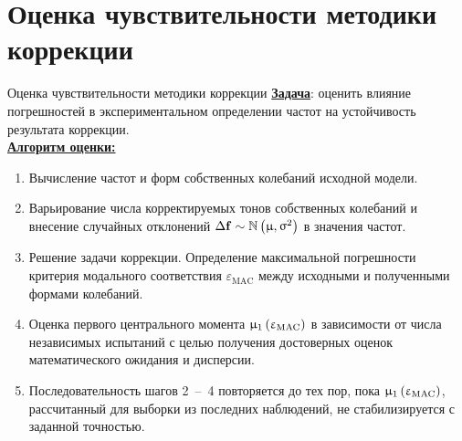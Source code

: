 \section{Оценка чувствительности методики коррекции}

\begin{frame}{Оценка чувствительности методики коррекции}
	\textbf{\underline{Задача}}: оценить влияние погрешностей в экспериментальном определении частот на устойчивость результата коррекции. \\ \vspace{0.5em}
	\textbf{\underline{Алгоритм оценки:}}
	\begin{enumerate}
		\item Вычисление частот и форм собственных колебаний исходной модели.
		\item Варьирование числа корректируемых тонов собственных колебаний и внесение случайных отклонений $ \Delta \mathbf{f} \sim \mathbb{N} \left( \upmu, \upsigma ^ 2 \right) $ в значения частот. 
		\item Решение задачи коррекции. Определение максимальной погрешности критерия модального соответствия $ \varepsilon_{\mathrm{MAC}} $ между исходными и полученными формами колебаний.
		\item Оценка первого центрального момента $ \upmu_1\left( \upvarepsilon_{\mathrm{MAC}} \right) $ в зависимости от числа независимых испытаний с целью получения достоверных оценок математического ожидания и дисперсии. 
		\item Последовательность шагов 2~--~4 повторяется до тех пор, пока $ \upmu_1\left( \upvarepsilon_{\mathrm{MAC}} \right) $, рассчитанный для выборки из последних наблюдений, не стабилизируется с заданной точностью.
	\end{enumerate}
\end{frame}

